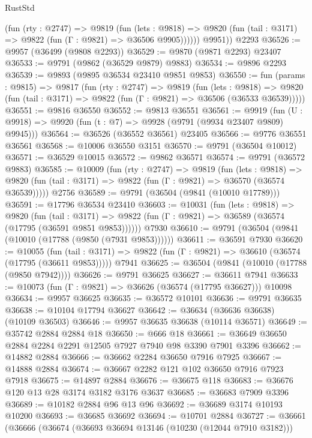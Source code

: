 \begin{lexlean}{RustStd}
\begin{coremodule}
            (fun (rty : @2747) =>
            @9819
              (fun (lets : @9818) =>
              @9820 (fun (tail : @3171) => @9822 (fun (Γ : @9821) => @36506 @9905))))))
        @9951))
    @2293
@36526 := @9957 (@36499 (@9808 @2293))
@36529 := @9870 (@9871 @2293) @23407
@36533 := @9791 (@9862 (@36529 @9879) @9883)
@36534 := @9896 @2293
@36539 := @9893 (@9895 @36534 @23410 @9851 @9853)
@36550 := fun (params : @9815) =>
  @9817
    (fun (rty : @2747) =>
    @9819
      (fun (lets : @9818) =>
      @9820 (fun (tail : @3171) => @9822 (fun (Γ : @9821) => @36506 (@36533 @36539)))))
@36551 := @9816 @36550
@36552 := @9813 @36551
@36561 := @9919
    (fun (U : @9918) => @9920 (fun (t : @7) => @9928 (@9791 (@9934 @23407 @9809) @9945)))
@36564 := @36526 (@36552 @36561) @23405
@36566 := @9776 @36551 @36561
@36568 := @10006 @36550 @3151
@36570 := @9791 (@36504 @10012)
@36571 := @36529 @10015
@36572 := @9862 @36571
@36574 := @9791 (@36572 @9883)
@36585 := @10009
    (fun (rty : @2747) =>
    @9819
      (fun (lets : @9818) =>
      @9820 (fun (tail : @3171) => @9822 (fun (Γ : @9821) => @36570 (@36574 @36539)))))
    @2756
@36589 := @9791 (@36504 (@9841 (@10010 @17789)))
@36591 := @17796 @36534 @23410
@36603 := @10031
    (fun (lets : @9818) =>
    @9820
      (fun (tail : @3171) =>
      @9822 (fun (Γ : @9821) => @36589 (@36574 (@17795 (@36591 @9851 @9853))))))
    @7930
@36610 := @9791 (@36504 (@9841 (@10010 (@17788 (@9850 (@7931 @9853))))))
@36611 := @36591 @7930
@36620 := @10055
    (fun (tail : @3171) => @9822 (fun (Γ : @9821) => @36610 (@36574 (@17795 (@36611 @9853)))))
    @7941
@36625 := @36504 (@9841 (@10010 (@17788 (@9850 @7942))))
@36626 := @9791 @36625
@36627 := @36611 @7941
@36633 := @10073 (fun (Γ : @9821) => @36626 (@36574 (@17795 @36627))) @10098
@36634 := @9957 @36625
@36635 := @36572 @10101
@36636 := @9791 @36635
@36638 := @10104 @17794 @36627
@36642 := @36634 (@36636 @36638) (@10109 @36503)
@36646 := @9957 @36635 @36638 (@10114 @36571)
@36649 := @35742 @2884 @2884 @18
@36650 := @666 @18
@36661 := @36649 @36650 @2884 @2284 @2291 @12505 @7927 @7940 @98 @3390 @7901 @3396
@36662 := @14882 @2884
@36666 := @36662 @2284 @36650 @7916 @7925
@36667 := @14888 @2884
@36674 := @36667 @2282 @121 @102 @36650 @7916 @7923 @7918
@36675 := @14897 @2884
@36676 := @36675 @118
@36683 := @36676 @120 @13 @28 @3174 @3182 @3176 @3637
@36685 := @36683 @7909 @3396
@36689 := @10182 @2884 @96 @13 @96
@36692 := @36689 @3174 @10193 @10200
@36693 := @36685 @36692
@36694 := @10701 @2884
@36727 := @36661
    (@36666
      (@36674
        (@36693 @36694 @13146 (@10230 (@12044 @7910 @3182)))

\end{coremodule}
\end{lexlean}
